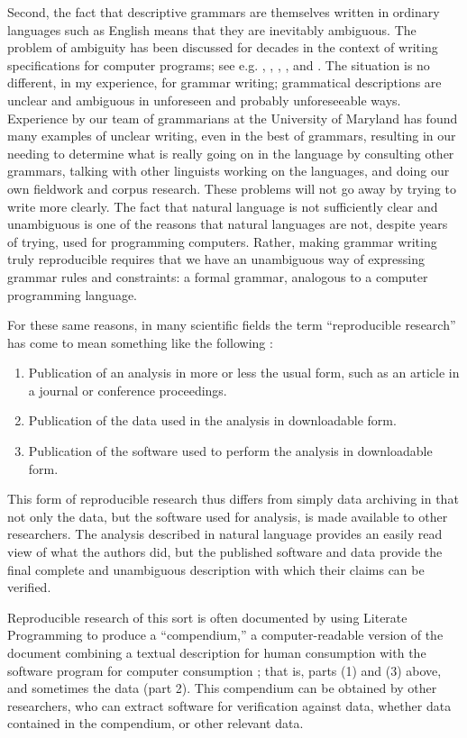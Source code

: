 Second, the fact that descriptive grammars are themselves written in ordinary languages such as English means that they are inevitably ambiguous. The problem of ambiguity has been discussed for decades in the context of writing specifications for computer programs; see e.g. \citet{Abbott1983}, \citet{Wiegers2003}, \citet{Meyer1985},  \citet{BerryEtAL2003}, and \citet{KamstiesEtAl2003}. The situation is no different, in my experience, for grammar writing; grammatical descriptions are unclear and ambiguous in unforeseen and probably unforeseeable ways. Experience by our team of grammarians at the University of Maryland has found many examples of unclear writing, even in the best of grammars, resulting in our needing to determine what is really going on in the language by consulting other grammars, talking with other linguists working on the languages, and doing our own fieldwork and corpus research. These problems will not go away by trying to write more clearly. The fact that natural language is not sufficiently clear and unambiguous is one of the reasons that natural languages are not, despite years of trying, used for programming computers. Rather, making grammar writing truly reproducible requires that we have an unambiguous way of expressing grammar rules and constraints: a formal grammar, analogous to a computer programming language. 

For these same reasons,  in many scientific fields the term ``reproducible research'' has come to mean something like the following :

\begin{enumerate}
\item Publication of an analysis in more or less the usual form, such as an article in a journal or conference proceedings.
\item Publication of the data used in the analysis in downloadable form.
\item Publication of the software used to perform the analysis in downloadable form. 
\end{enumerate}

This form of reproducible research thus differs from simply data archiving in that not only the data, but the software used for analysis, is made available to other researchers. The analysis described in natural language provides an easily read view of what the authors did, but the published software and data provide the final complete and unambiguous description with which their claims can be verified.

Reproducible research of this sort is often documented by using Literate Programming \citep{Knuth1992} to produce a ``compendium,'' a computer-readable version of the document combining a textual description for human consumption with the software program for computer consumption \citep{GentlemanEtAl2004}; that is, parts (1) and (3) above, and sometimes the data (part 2). This compendium can be obtained by other researchers, who can extract software for verification against data, whether data contained in the compendium, or other relevant data.

